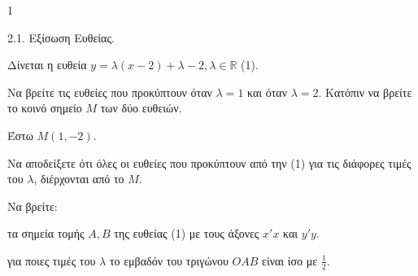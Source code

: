 \begin{ylh}{1}
    \item 2.1. Εξίσωση Ευθείας.
\end{ylh}
Δίνεται η ευθεία $y=\lambda(x-2)+\lambda-2, \lambda\in\mathbb{R}$ (1).

\begin{alist}
\item Να βρείτε τις ευθείες που προκύπτουν όταν $\lambda=1$ και όταν $\lambda=2$. Κατόπιν να βρείτε το κοινό σημείο $M$ των δύο ευθειών.  

Έστω $M(1, -2)$.

\item Να αποδείξετε ότι όλες οι ευθείες που προκύπτουν από την (1) για τις διάφορες τιμές του $\lambda$, διέρχονται από το $M$.  

\item Να βρείτε:
\begin{rlist}
\item τα σημεία τομής $A, B$ της ευθείας (1) με τους άξονες $x'x$ και $y'y$.  
\item για ποιες τιμές του $\lambda$ το εμβαδόν του τριγώνου $OAB$ είναι ίσο με $\frac{1}{2}$.  
\end{rlist}
\end{alist}